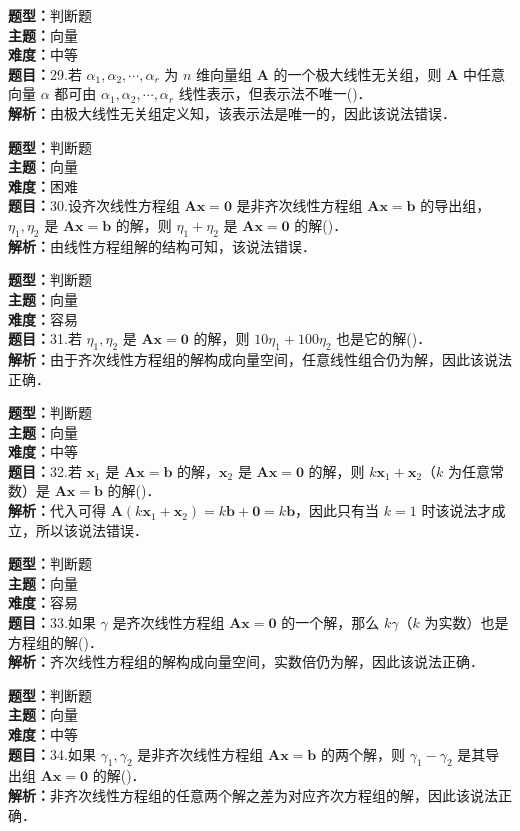 \documentclass{ctexart}
\newenvironment{question}[5]{%
	\noindent\textbf{题型：}#1\\
	\textbf{主题：}#2\\
	\textbf{难度：}#3\\
	\textbf{题目：}#4\\
	\textbf{解析：}#5\\
	\vspace{1em}
}{}
\begin{document}
	\begin{question}
		{判断题}
		{向量}
		{中等}
		{29.若 \(\alpha_1, \alpha_2, \cdots, \alpha_r\) 为 \(n\) 维向量组 \(\mathbf{A}\) 的一个极大线性无关组，则 \(\mathbf{A}\) 中任意向量 \(\alpha\) 都可由 \(\alpha_1, \alpha_2, \cdots, \alpha_r\) 线性表示，但表示法不唯一(\qquad)．}
		{由极大线性无关组定义知，该表示法是唯一的，因此该说法错误．}
	\end{question}
	
	\begin{question}
		{判断题}
		{向量}
		{困难}
		{30.设齐次线性方程组 \(\mathbf{Ax} = \mathbf{0}\) 是非齐次线性方程组 \(\mathbf{Ax} = \mathbf{b}\) 的导出组，\(\eta_1, \eta_2\) 是 \(\mathbf{Ax} = \mathbf{b}\) 的解，则 \(\eta_1 + \eta_2\) 是 \(\mathbf{Ax} = \mathbf{0}\) 的解(\qquad)．}
		{由线性方程组解的结构可知，该说法错误．}
	\end{question}
	
	\begin{question}
		{判断题}
		{向量}
		{容易}
		{31.若 \(\eta_1, \eta_2\) 是 \(\mathbf{Ax} = \mathbf{0}\) 的解，则 \(10\eta_1 + 100\eta_2\) 也是它的解(\qquad)．}
		{由于齐次线性方程组的解构成向量空间，任意线性组合仍为解，因此该说法正确．}
	\end{question}
	
	\begin{question}
		{判断题}
		{向量}
		{中等}
		{32.若 \(\mathbf{x}_1\) 是 \(\mathbf{Ax} = \mathbf{b}\) 的解，\(\mathbf{x}_2\) 是 \(\mathbf{Ax} = \mathbf{0}\) 的解，则 \(k\mathbf{x}_1 + \mathbf{x}_2\)（\(k\) 为任意常数）是 \(\mathbf{Ax} = \mathbf{b}\) 的解(\qquad)．}
		{代入可得 \(\mathbf{A}(k\mathbf{x}_1 + \mathbf{x}_2) = k\mathbf{b} + \mathbf{0} = k\mathbf{b}\)，因此只有当 \(k=1\) 时该说法才成立，所以该说法错误．}
	\end{question}
	
	\begin{question}
		{判断题}
		{向量}
		{容易}
		{33.如果 \(\gamma\) 是齐次线性方程组 \(\mathbf{Ax} = \mathbf{0}\) 的一个解，那么 \(k\gamma\)（\(k\) 为实数）也是方程组的解(\qquad)．}
		{齐次线性方程组的解构成向量空间，实数倍仍为解，因此该说法正确．}
	\end{question}
	
	\begin{question}
		{判断题}
		{向量}
		{中等}
		{34.如果 \(\gamma_1, \gamma_2\) 是非齐次线性方程组 \(\mathbf{Ax} = \mathbf{b}\) 的两个解，则 \(\gamma_1 - \gamma_2\) 是其导出组 \(\mathbf{Ax} = \mathbf{0}\) 的解(\qquad)．}
		{非齐次线性方程组的任意两个解之差为对应齐次方程组的解，因此该说法正确．}
	\end{question}
	
\end{document}
